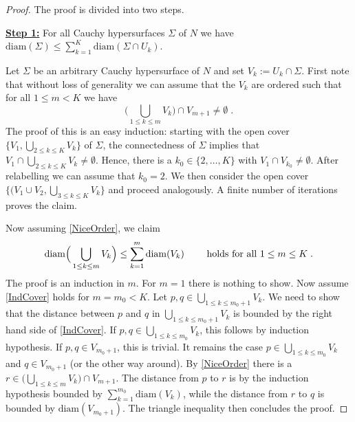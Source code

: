\documentclass[reqno]{article}
\newcommand{\diam}{\mathrm{diam}}
\begin{document}
\begin{proof}
The proof is divided into two steps.
\vspace*{2mm}

\underline{\textbf{Step 1:}} For all Cauchy hypersurfaces $\Sigma$ of $N$ we have $\diam (\Sigma) \leq \sum_{k =1}^K \diam(\Sigma \cap U_k)$.
\vspace*{2mm}

Let $\Sigma$ be an arbitrary Cauchy hypersurface of $N$ and set $V_k := U_k \cap \Sigma$.
First note that without loss of generality we can assume that the $V_k$ are ordered such that for all $1 \leq m < K$ we have
\begin{equation}
\label{NiceOrder}
\Big(\bigcup_{1 \leq k \leq m} V_k \Big) \cap V_{m+1} \neq \emptyset \;.
\end{equation}
The proof of this is an easy induction: starting with the open cover $\{ V_1, \bigcup_{2 \leq k \leq K} V_k \}$ of $\Sigma$, the connectedness of $\Sigma$ implies that $V_1 \cap \bigcup_{2 \leq k \leq K} V_k \neq \emptyset$. Hence, there is a $k_0 \in \{2, \ldots, K\}$ with  $V_1 \cap V_{k_0} \neq \emptyset$. After relabelling we can assume that $k_0 = 2$. We then  consider the open cover $\{(V_1 \cup V_2, \bigcup_{3 \leq k \leq K}V_k\}$ and proceed analogously. A finite number of iterations proves the claim.

Now assuming \eqref{NiceOrder}, we claim
\begin{equation}
\label{IndCover}
\diam\Big(\bigcup_{1 \leq k \leq m} V_k \Big) \leq \sum_{k=1}^m \diam(V_k) \qquad \textnormal{ holds for all } 1 \leq m \leq K \;.
\end{equation}
The proof is an induction in $m$. For $m=1$ there is nothing to show. Now assume \eqref{IndCover} holds for $m = m_0 < K$. Let $p,q \in \bigcup_{1 \leq k \leq m_0 + 1} V_k$. We need to show that the distance between $p$ and $q$ in $\bigcup_{1 \leq k \leq m_0 + 1} V_k$ is bounded by the right hand side of \eqref{IndCover}. If $p, q \in \bigcup_{1 \leq k \leq m_0} V_k$, this follows by induction hypothesis. If $p,q \in V_{m_0 + 1}$, this is trivial. It remains the case $p \in \bigcup_{1 \leq k \leq m_0} V_k$ and $q \in V_{m_0 +1}$ (or  the other way around). By \eqref{NiceOrder} there is a $r \in \Big(\bigcup_{1 \leq k \leq m} V_k \Big) \cap V_{m+1} $. The distance from $p$ to $r$ is by the induction hypothesis bounded by $\sum_{k=1}^{m_0} \diam(V_k) $, while the distance from $r$ to $q$ is bounded by $\diam(V_{m_0 + 1})$. The triangle inequality then concludes the proof.
\vspace*{2mm}


\end{proof}
\end{document}
